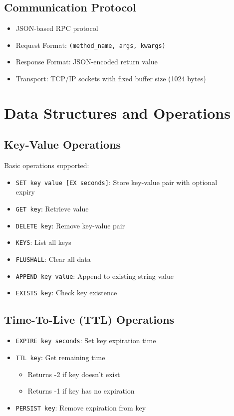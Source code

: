 \documentclass[11pt]{article}
\begin{document}
\subsection{Communication Protocol}
\begin{itemize}
    \item JSON-based RPC protocol
    \item Request Format: \texttt{(method\_name, args, kwargs)}
    \item Response Format: JSON-encoded return value
    \item Transport: TCP/IP sockets with fixed buffer size (1024 bytes)
\end{itemize}

\section{Data Structures and Operations}

\subsection{Key-Value Operations}
Basic operations supported:
\begin{itemize}
    \item \texttt{SET key value [EX seconds]}: Store key-value pair with optional  \\ expiry
    \item \texttt{GET key}: Retrieve value
    \item \texttt{DELETE key}: Remove key-value pair
    \item \texttt{KEYS}: List all keys
    \item \texttt{FLUSHALL}: Clear all data
    \item \texttt{APPEND key value}: Append to existing string value
    \item \texttt{EXISTS key}: Check key existence
\end{itemize}

\subsection{Time-To-Live (TTL) Operations}
\begin{itemize}
    \item \texttt{EXPIRE key seconds}: Set key expiration time
    \item \texttt{TTL key}: Get remaining time
    \begin{itemize}
        \item Returns -2 if key doesn't exist
        \item Returns -1 if key has no expiration
    \end{itemize}
    \item \texttt{PERSIST key}: Remove expiration from key
\end{itemize}
\end{document}
